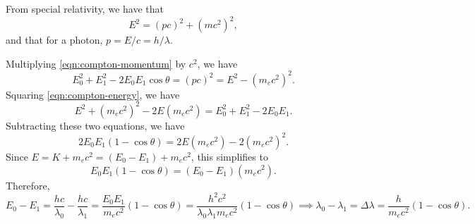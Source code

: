 \documentclass{standalone}
\begin{document}
From special relativity, we have that
\[
	E^2 = (pc)^2 + (mc^2)^2,
\]
and that for a photon, \(p = E/c = h/\lambda\).

Multiplying \cref{eqn:compton-momentum} by \(c^2\), we have
\[
	E_0^2 + E_1^2 - 2E_0 E_1 \cos\theta = (pc)^2 = E^2 - (m_e c^2)^2.
\]
Squaring \cref{eqn:compton-energy}, we have
\[
	E^2 + (m_e c^2)^2 - 2E(m_e c^2) = E_0^2 + E_1^2 - 2E_0 E_1.
\]
Subtracting these two equations, we have
\[
	2E_0E_1(1 - \cos\theta) = 2E(m_e c^2) - 2(m_e c^2)^2.
\]
Since \(E = K + m_e c^2 = (E_0 - E_1) + m_e c^2\), this simplifies to
\[
	E_0E_1(1 - \cos\theta) = (E_0 - E_1)(m_e c^2).
\]
Therefore,
\[
	E_0 - E_1 = \frac{hc}{\lambda_0} - \frac{hc}{\lambda_1} = \frac{E_0E_1}{m_e c^2}(1 - \cos\theta) = \frac{h^2c^2}{\lambda_0 \lambda_1 m_e c^2} (1 - \cos\theta)
		\implies \lambda_0 - \lambda_1 = \Delta \lambda = \frac{h}{m_e c^2}(1 - \cos\theta).
\]
\end{document}
